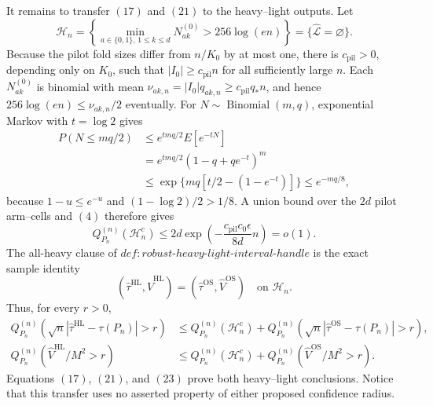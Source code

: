 It remains to transfer \((17)\) and \((21)\) to the heavy--light outputs.
Let
\[
 \mathcal H_n
 =\left\{\min_{a\in\{0,1\},\,1\le k\le d}N_{ak}^{(0)}
             >256\log(en)\right\}
 =\{\widehat{\mathcal L}=\varnothing\}.
\]
Because the pilot fold sizes differ from \(n/K_0\) by at most one, there is
\(c_{\mathrm{pil}}>0\), depending only on \(K_0\), such that
\(|I_0|\ge c_{\mathrm{pil}}n\) for all sufficiently large \(n\).  Each
\(N_{ak}^{(0)}\) is binomial with mean
\(\nu_{ak,n}=|I_0|q_{ak,n}\ge c_{\mathrm{pil}}q_*n\), and hence
\(256\log(en)\le\nu_{ak,n}/2\) eventually.  For
\(N\sim\operatorname{Binomial}(m,q)\), exponential Markov with
\(t=\log2\) gives
\[
 \begin{aligned}
 P(N\le mq/2)
 &\le e^{tmq/2}E[e^{-tN}]\\
 &=e^{tmq/2}(1-q+qe^{-t})^m\\
 &\le\exp\{mq[t/2-(1-e^{-t})]\}
 \le e^{-mq/8},
 \end{aligned}                                                     \tag{22}
\]
because \(1-u\le e^{-u}\) and \((1-\log2)/2>1/8\).  A union bound over
the \(2d\) pilot arm--cells and \((4)\) therefore gives
\[
 Q_{P_n}^{(n)}(\mathcal H_n^c)
 \le2d\exp\!\left(-\frac{c_{\mathrm{pil}}c_0\epsilon}{8d}n\right)
 =o(1).                                                            \tag{23}
\]
The all-heavy clause of
\(def:robust\text{-}heavy\text{-}light\text{-}interval\text{-}handle\)
is the exact sample identity
\[
 (\widehat\tau^{\mathrm{HL}},\widehat V^{\mathrm{HL}})
 =(\widehat\tau^{\mathrm{OS}},\widehat V^{\mathrm{OS}})
 \quad\text{on }\mathcal H_n.                                     \tag{24}
\]
Thus, for every \(r>0\),
\[
 \begin{aligned}
 Q_{P_n}^{(n)}\!\left(\sqrt n
   |\widehat\tau^{\mathrm{HL}}-\tau(P_n)|>r\right)
 &\le Q_{P_n}^{(n)}(\mathcal H_n^c)
  +Q_{P_n}^{(n)}\!\left(\sqrt n
   |\widehat\tau^{\mathrm{OS}}-\tau(P_n)|>r\right),\\
 Q_{P_n}^{(n)}\!\left(\widehat V^{\mathrm{HL}}/M^2>r\right)
 &\le Q_{P_n}^{(n)}(\mathcal H_n^c)
  +Q_{P_n}^{(n)}\!\left(\widehat V^{\mathrm{OS}}/M^2>r\right).
 \end{aligned}                                                     \tag{25}
\]
Equations \((17)\), \((21)\), and \((23)\) prove both heavy--light
conclusions.  Notice that this transfer uses no asserted property of either
proposed confidence radius.

